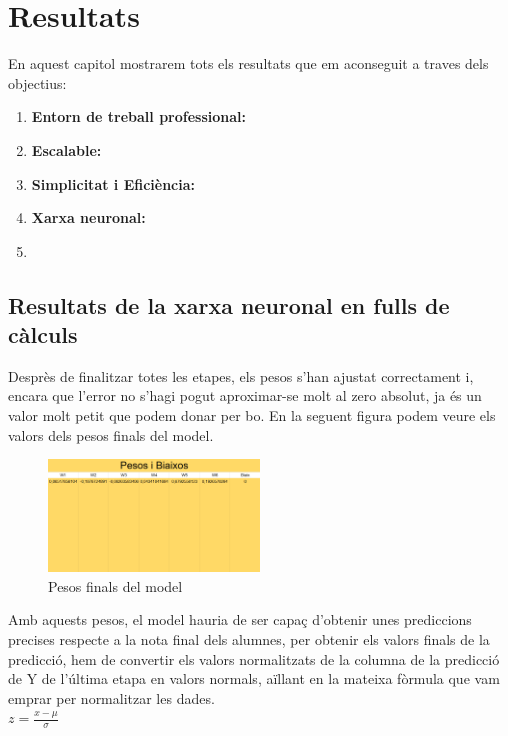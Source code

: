 \chapter{Resultats}
\label{c:Resultats}

En aquest capitol mostrarem tots els resultats que em aconseguit a traves dels objectius:
\begin{enumerate}
     \item \textbf{Entorn de treball professional: }
     \item \textbf{Escalable: }
     \item \textbf{Simplicitat i Eficiència: }
     \item \textbf{Xarxa neuronal: }
     \item \textbf{ }
\end{enumerate}


\section{Resultats de la xarxa neuronal en fulls de càlculs}\label{sec: full de càlcul}
Desprès de finalitzar totes les etapes, els pesos s'han ajustat correctament i, encara que l'error no s'hagi pogut aproximar-se molt al zero absolut, ja és un valor molt petit que podem donar per bo. En la seguent figura podem veure els valors dels pesos finals del model.\\

\begin{figure}[H]
    \centering
    \includegraphics[width=0.5\textwidth]{./figures/Pesos_finals.png}
    \caption{Pesos finals del model}
\end{figure}

Amb aquests pesos, el model hauria de ser capaç d'obtenir unes prediccions precises respecte a la nota final dels alumnes, per obtenir els valors finals de la predicció, hem de convertir els valors normalitzats de la columna de la predicció de Y de l'última etapa en valors normals, aïllant en la mateixa fòrmula que vam emprar per normalitzar les dades.\\
$z = \frac{x - \mu}{\sigma}$\\

